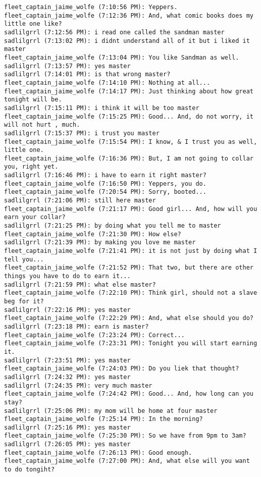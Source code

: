 \begin{verbatim}
fleet_captain_jaime_wolfe (7:10:56 PM): Yeppers.
fleet_captain_jaime_wolfe (7:12:36 PM): And, what comic books does my little one like?
sadlilgrrl (7:12:56 PM): i read one called the sandman master
sadlilgrrl (7:13:02 PM): i didnt understand all of it but i liked it master
fleet_captain_jaime_wolfe (7:13:04 PM): You like Sandman as well.
sadlilgrrl (7:13:57 PM): yes master
sadlilgrrl (7:14:01 PM): is that wrong master?
fleet_captain_jaime_wolfe (7:14:10 PM): Nothing at all...
fleet_captain_jaime_wolfe (7:14:17 PM): Just thinking about how great tonight will be.
sadlilgrrl (7:15:11 PM): i think it will be too master
fleet_captain_jaime_wolfe (7:15:25 PM): Good... And, do not worry, it will not hurt , much.
sadlilgrrl (7:15:37 PM): i trust you master
fleet_captain_jaime_wolfe (7:15:54 PM): I know, & I trust you as well, little one.
fleet_captain_jaime_wolfe (7:16:36 PM): But, I am not going to collar you, right yet.
sadlilgrrl (7:16:46 PM): i have to earn it right master?
fleet_captain_jaime_wolfe (7:16:50 PM): Yeppers, you do.
fleet_captain_jaime_wolfe (7:20:54 PM): Sorry, booted...
sadlilgrrl (7:21:06 PM): still here master
fleet_captain_jaime_wolfe (7:21:17 PM): Good girl... And, how will you earn your collar?
sadlilgrrl (7:21:25 PM): by doing what you tell me to master
fleet_captain_jaime_wolfe (7:21:30 PM): How else?
sadlilgrrl (7:21:39 PM): by making you love me master
fleet_captain_jaime_wolfe (7:21:41 PM): it is not just by doing what I tell you...
fleet_captain_jaime_wolfe (7:21:52 PM): That two, but there are other things you have to do to earn it...
sadlilgrrl (7:21:59 PM): what else master?
fleet_captain_jaime_wolfe (7:22:10 PM): Think girl, should not a slave beg for it?
sadlilgrrl (7:22:16 PM): yes master
fleet_captain_jaime_wolfe (7:22:29 PM): And, what else should you do?
sadlilgrrl (7:23:18 PM): earn is master?
fleet_captain_jaime_wolfe (7:23:24 PM): Correct...
fleet_captain_jaime_wolfe (7:23:31 PM): Tonight you will start earning it.
sadlilgrrl (7:23:51 PM): yes master
fleet_captain_jaime_wolfe (7:24:03 PM): Do you liek that thought?
sadlilgrrl (7:24:32 PM): yes master
sadlilgrrl (7:24:35 PM): very much master
fleet_captain_jaime_wolfe (7:24:42 PM): Good... And, how long can you stay?
sadlilgrrl (7:25:06 PM): my mom will be home at four master
fleet_captain_jaime_wolfe (7:25:14 PM): In the morning?
sadlilgrrl (7:25:16 PM): yes master
fleet_captain_jaime_wolfe (7:25:30 PM): So we have from 9pm to 3am?
sadlilgrrl (7:26:05 PM): yes master
fleet_captain_jaime_wolfe (7:26:13 PM): Good enough.
fleet_captain_jaime_wolfe (7:27:00 PM): And, what else will you want to do tongiht?

\end{verbatim}
